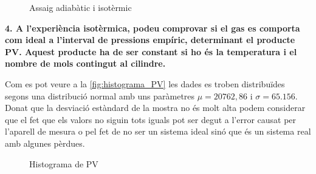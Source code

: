 \documentclass[a4paper]{article}
\begin{document}
\begin{figure}[!h]
\centering
\caption{Assaig adiabàtic  i isotèrmic}
\label{fig:asssaig_ad_iso}
\end{figure}

\textbf{4. A l’experiència isotèrmica, podeu comprovar si el gas es comporta com ideal a l’interval de pressions empíric, determinant el producte PV. Aquest producte ha de ser constant si ho és la temperatura i el nombre de mols contingut al cilindre.}

Com es pot veure a la \autoref{fig:histograma_PV} les dades es troben distribuïdes segons una distribució normal amb uns paràmetres $\mu = 20762,86$ i $\sigma = 65.156$. Donat que la desviació estàndard de la mostra no és molt alta podem considerar que el fet que els valors no siguin tots iguals pot ser degut a l'error causat per l'aparell de mesura o pel fet de no ser un sistema ideal sinó que és un sistema real amb algunes pèrdues.

\begin{figure}[H]
	\centering
	\caption{Histograma de PV}
	\label{fig:histograma_PV}
\end{figure}
\end{document}

